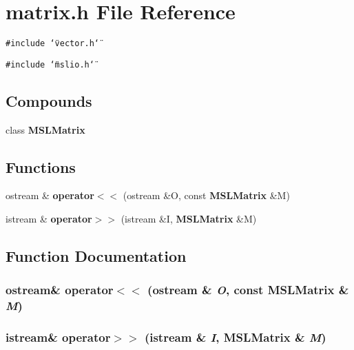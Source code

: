 \section{matrix.h File Reference}
\label{matrix_8h}
{\tt \#include \char`\"{}vector.h\char`\"{}}\par
{\tt \#include \char`\"{}mslio.h\char`\"{}}\par
\subsection*{Compounds}
\begin{CompactItemize}
\item 
class {\bf MSLMatrix}
\end{CompactItemize}
\subsection*{Functions}
\begin{CompactItemize}
\item 
ostream \& {\bf operator$<$$<$} (ostream \&O, const {\bf MSLMatrix} \&M)
\item 
istream \& {\bf operator$>$$>$} (istream \&I, {\bf MSLMatrix} \&M)
\end{CompactItemize}


\subsection{Function Documentation}
\subsubsection{\setlength{\rightskip}{0pt plus 5cm}ostream\& operator$<$$<$ (ostream \& {\em O}, const {\bf MSLMatrix} \& {\em M})}\label{matrix_8h_a0}


\subsubsection{\setlength{\rightskip}{0pt plus 5cm}istream\& operator$>$$>$ (istream \& {\em I}, {\bf MSLMatrix} \& {\em M})}\label{matrix_8h_a1}


